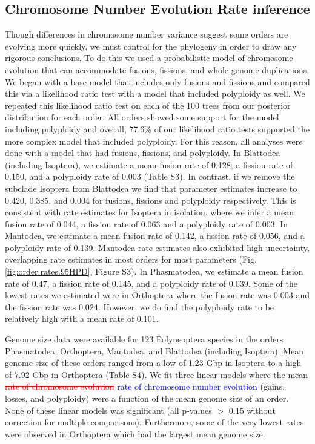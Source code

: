 \documentclass[]{rsos}%
\begin{document}
\subsection{Chromosome Number Evolution Rate inference}
Though differences in chromosome number variance suggest some orders are evolving more quickly, we must control for the phylogeny in order to draw any rigorous conclusions.
To do this we used a probabilistic model of chromosome evolution that can accommodate fusions, fissions, and whole genome duplications.
We began with a base model that includes only fusions and fissions and compared this via a likelihood ratio test with a model that included polyploidy as well.
We repeated this likelihood ratio test on each of the 100 trees from our posterior distribution for each order.
All orders showed some support for the model including polyploidy and overall, 77.6\% of our likelihood ratio tests supported the more complex model that included polyploidy.
For this reason, all analyses were done with a model that had fusions, fissions, and polyploidy.
In Blattodea (including Isoptera), we estimate a mean fusion rate of 0.128, a fission rate of 0.150, and a polyploidy rate of 0.003 (Table S3).
In contrast, if we remove the subclade Isoptera from Blattodea we find that parameter estimates increase to 0.420, 0.385, and 0.004 for fusions, fissions and polyploidy respectively.
This is consistent with rate estimates for Isoptera in isolation, where we infer a mean fusion rate of 0.044, a fission rate of 0.063 and a polyploidy rate of 0.003.
In Mantodea, we estimate a mean fusion rate of 0.142, a fission rate of 0.056, and a polyploidy rate of 0.139.
Mantodea rate estimates also exhibited high uncertainty, overlapping rate estimates in most orders for most parameters (Fig. \ref{fig:order.rates.95HPD}, Figure S3).
In Phasmatodea, we estimate a mean fusion rate of 0.47, a fission rate of 0.145, and a polyploidy rate of 0.039.
Some of the lowest rates we estimated were in Orthoptera where the fusion rate was 0.003 and the fission rate was 0.024. However, we do find the polyploidy rate to be relatively high with a mean rate of 0.101.

Genome size data were available for 123 Polyneoptera species in the orders Phasmatodea, Orthoptera, Mantodea, and Blattodea (including Isoptera).
Mean genome size of these orders ranged from a low of 1.23 Gbp in Isoptera to a high of 7.92 Gbp in Orthoptera (Table S4).
We fit three linear models where the mean \textcolor{red}{\st{rate of chromosome evolution}} \textcolor{blue}{rate of chromosome number evolution} (gains, losses, and polyploidy) were a function of the mean genome size of an order.
None of these linear models was significant (all p-values $>$ 0.15 without correction for multiple comparisons).
Furthermore, some of the very lowest rates were observed in Orthoptera which had the largest mean genome size.
\end{document}

